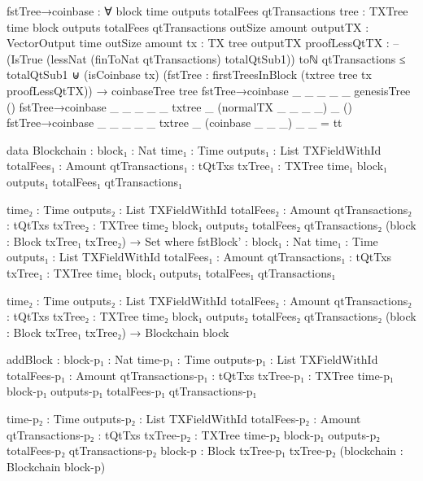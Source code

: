 \documentclass{beamer}
\begin{document}
\begin{code}
    fstTree→coinbase : ∀
      {block time outputs totalFees qtTransactions}
      {tree : TXTree time block outputs totalFees qtTransactions}
      {outSize amount}
      {outputTX : VectorOutput time outSize amount}
      {tx : TX tree outputTX}
      {proofLessQtTX :
          -- (IsTrue (lessNat (finToNat qtTransactions) totalQtSub1))
          toℕ qtTransactions ≤ totalQtSub1
          ⊎
          (isCoinbase tx)}
      (fstTree : firstTreesInBlock (txtree tree tx proofLessQtTX))
      → coinbaseTree tree
    fstTree→coinbase {_} {_} {_} {_} {_} {genesisTree} ()
    fstTree→coinbase {_} {_} {_} {_} {_} {txtree _ (normalTX _ _ _ _) _} ()
    fstTree→coinbase {_} {_} {_} {_} {_} {txtree _ (coinbase _ _ _) _} _ = tt

    data Blockchain :
      {block₁ : Nat}
      {time₁ : Time}
      {outputs₁ : List TXFieldWithId}
      {totalFees₁ : Amount}
      {qtTransactions₁ : tQtTxs}
      {txTree₁ : TXTree time₁ block₁ outputs₁ totalFees₁ qtTransactions₁}

      {time₂ : Time}
      {outputs₂ : List TXFieldWithId}
      {totalFees₂ : Amount}
      {qtTransactions₂ : tQtTxs}
      {txTree₂ : TXTree time₂ block₁ outputs₂ totalFees₂ qtTransactions₂}
      (block : Block txTree₁ txTree₂)
      → Set where
        fstBlock' :
          {block₁ : Nat}
          {time₁ : Time}
          {outputs₁ : List TXFieldWithId}
          {totalFees₁ : Amount}
          {qtTransactions₁ : tQtTxs}
          {txTree₁ : TXTree time₁ block₁ outputs₁ totalFees₁ qtTransactions₁}

          {time₂ : Time}
          {outputs₂ : List TXFieldWithId}
          {totalFees₂ : Amount}
          {qtTransactions₂ : tQtTxs}
          {txTree₂ : TXTree time₂ block₁ outputs₂ totalFees₂ qtTransactions₂}
          (block : Block txTree₁ txTree₂)
          → Blockchain block

        addBlock :
          {block-p₁ : Nat}
          {time-p₁ : Time}
          {outputs-p₁ : List TXFieldWithId}
          {totalFees-p₁ : Amount}
          {qtTransactions-p₁ : tQtTxs}
          {txTree-p₁ : TXTree time-p₁ block-p₁ outputs-p₁ totalFees-p₁ qtTransactions-p₁}

          {time-p₂ : Time}
          {outputs-p₂ : List TXFieldWithId}
          {totalFees-p₂ : Amount}
          {qtTransactions-p₂ : tQtTxs}
          {txTree-p₂ : TXTree time-p₂ block-p₁ outputs-p₂ totalFees-p₂ qtTransactions-p₂}
          {block-p : Block txTree-p₁ txTree-p₂}
          (blockchain : Blockchain block-p)


\end{code}
\end{document}
